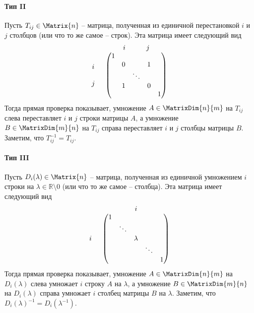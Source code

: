\paragraph{Тип II}
Пусть $T_{ij}\in\Matrix{n}$ -- матрица, полученная из единичной перестановкой $i$ и $j$ столбцов (или что то же самое -- строк).
Эта матрица имеет следующий вид
\[
\begin{tabular}{cc}
{}&{$i$\quad \quad\quad $j$}\\
{
$
\begin{matrix}
{}\\{i}\\{}\\{j}\\{}
\end{matrix}
$}&{
$
\begin{pmatrix}
{1}&{}&{}&{}&{}\\
{}&{0}&{}&{1}&{}\\
{}&{}&{\ddots}&{}&{}\\
{}&{1}&{}&{0}&{}\\
{}&{}&{}&{}&{1}\\
\end{pmatrix}
$
}
\end{tabular}
\]
Тогда прямая проверка показывает, умножение $A\in\MatrixDim{n}{m}$ на $T_{ij}$ слева переставляет $i$ и $j$ строки матрицы $A$, а умножение $B\in\MatrixDim{m}{n}$ на $T_{ij}$ справа переставляет $i$ и $j$ столбцы матрицы $B$.
Заметим, что $T_{ij}^{-1} = T_{ij}$.


\paragraph{Тип III}
Пусть $D_i(\lambda)\in\Matrix{n}$ -- матрица, полученная из единичной умножением $i$ строки на $\lambda\in\mathbb R\setminus 0$ (или что то же самое -- столбца).
Эта матрица имеет следующий вид
\[
\begin{tabular}{cc}
{}&{$i$}\\
{
$
\begin{matrix}
{}\\{}\\{i}\\{}\\{}
\end{matrix}
$}&{
$
\begin{pmatrix}
{1}&{}&{}&{}&{}\\
{}&{\ddots}&{}&{}&{}\\
{}&{}&{\lambda}&{}&{}\\
{}&{}&{}&{\ddots}&{}\\
{}&{}&{}&{}&{1}\\
\end{pmatrix}
$
}
\end{tabular}
\]
Тогда прямая проверка показывает, умножение $A\in\MatrixDim{n}{m}$ на $D_i(\lambda)$ слева умножает $i$ строку $A$ на $\lambda$, а умножение $B\in\MatrixDim{m}{n}$ на $D_i(\lambda)$ справа умножает $i$ столбец матрицы $B$ на $\lambda$.
Заметим, что $D_i(\lambda)^{-1}= D_i(\lambda^{-1})$.

